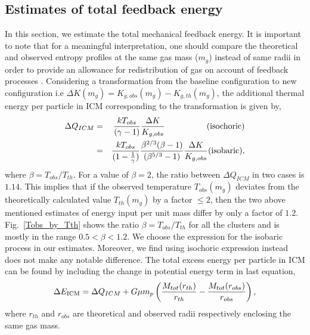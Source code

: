 \documentclass[a4paper,fleqn,usenatbib]{mnras}
\begin{document}
\subsection{Estimates of total feedback energy}
In  this section, we estimate the total mechanical feedback energy. It is important to note that for  a meaningful interpretation, one should  compare the theoretical and observed entropy profiles at the same gas mass  ($m_g$) instead of 
same radii in order to provide an allowance for redistribution of gas on account of feedback processes \citep{Li2010,Nath2011,Chaudhuri2012,Chaudhuri2013}. 
Considering a transformation from the baseline configuration to new configuration 
i.e $\Delta K(m_g)=K_{g,obs}(m_g)-K_{g,th}(m_g)$, the additional thermal energy per particle in ICM corresponding to the transformation is given by,
\begin{eqnarray}
\Delta Q_{ICM} &=& {kT_{obs} \over
(\gamma-1 )} {\Delta K \over K_{g,obs}}  \qquad\qquad \quad ({\rm isochoric})\nonumber\\
&=&{kT_{obs}  \over (1-{1 \over \gamma})} 
{  \beta ^{2/3} (\beta -1) \over (\beta^{5/3}-1)}
{\Delta K \over K_{g,obs}}  ({\rm isobaric}),
\label{eq:delq}
\end{eqnarray}
where $\beta=T_{obs}/T_{th}$. For a value of $\beta=2$, the ratio between $\Delta Q_{ICM}$ in two cases is $1.14$. This implies that if the
observed temperature $T_{obs}(m_g)$ deviates from the theoretically calculated value $T_{th} (m_g)$
by a factor $\le 2$, then the two above mentioned estimates of energy input per unit mass differ by only a factor of $1.2$. 
Fig.~\ref{Tobs_by_Tth} shows the ratio  $\beta=T_{obs}/T_{th}$ for all the clusters and is mostly in the range $0.5<\beta<1.2$. We choose the expression for 
the isobaric process in our estimates. Moreover, we find using isochoric expression instead does not make any notable difference.
The total excess energy per particle in ICM can be found by including the change in potential energy term in last equation,
\begin{equation}
\Delta E_{\rm ICM}=\Delta Q_{ICM}+G\mu m_p\left(\frac {M_{tot}(r_{th})}{r_{th}}-\frac{M_{tot}(r_{obs})}{r_{obs}}\right), 
\end{equation}
where $r_{th}$ and $r_{obs}$ are theoretical and observed radii respectively enclosing the same gas mass.
\end{document}
